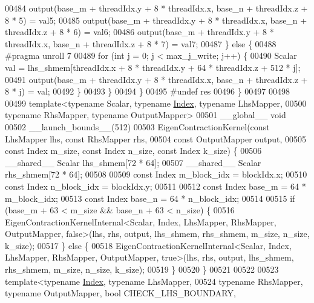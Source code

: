 \begin{DoxyCode}
00484       output(base\_m + threadIdx.y + 8 * threadIdx.x, base\_n + threadIdx.z + 8 * 5) = val5;
00485       output(base\_m + threadIdx.y + 8 * threadIdx.x, base\_n + threadIdx.z + 8 * 6) = val6;
00486       output(base\_m + threadIdx.y + 8 * threadIdx.x, base\_n + threadIdx.z + 8 * 7) = val7;
00487     \} \textcolor{keywordflow}{else} \{
00488 \textcolor{preprocessor}{#pragma unroll 7}
00489       \textcolor{keywordflow}{for} (\textcolor{keywordtype}{int} j = 0; j < max\_j\_write; j++) \{
00490         Scalar val = lhs\_shmem[threadIdx.x + 8 * threadIdx.y + 64 * threadIdx.z + 512 * j];
00491         output(base\_m + threadIdx.y + 8 * threadIdx.x, base\_n + threadIdx.z + 8 * j) = val;
00492       \}
00493     \}
00494   \}
00495 \textcolor{preprocessor}{#undef res}
00496 \}
00497 
00498 
00499 \textcolor{keyword}{template}<\textcolor{keyword}{typename} Scalar, \textcolor{keyword}{typename} \hyperlink{namespace_eigen_a62e77e0933482dafde8fe197d9a2cfde}{Index}, \textcolor{keyword}{typename} LhsMapper,
00500          \textcolor{keyword}{typename} RhsMapper, \textcolor{keyword}{typename} OutputMapper>
00501 \_\_global\_\_ \textcolor{keywordtype}{void}
00502 \_\_launch\_bounds\_\_(512)
00503 EigenContractionKernel(const LhsMapper lhs, const RhsMapper rhs,
00504                        const OutputMapper output,
00505                        const Index m\_size, const Index n\_size, const Index k\_size) \{
00506   \_\_shared\_\_ Scalar lhs\_shmem[72 * 64];
00507   \_\_shared\_\_ Scalar rhs\_shmem[72 * 64];
00508 
00509   \textcolor{keyword}{const} Index m\_block\_idx = blockIdx.x;
00510   \textcolor{keyword}{const} Index n\_block\_idx = blockIdx.y;
00511 
00512   \textcolor{keyword}{const} Index base\_m = 64 * m\_block\_idx;
00513   \textcolor{keyword}{const} Index base\_n = 64 * n\_block\_idx;
00514 
00515   \textcolor{keywordflow}{if} (base\_m + 63 < m\_size && base\_n + 63 < n\_size) \{
00516     EigenContractionKernelInternal<Scalar, Index, LhsMapper, RhsMapper, OutputMapper, false>(lhs, rhs, 
      output, lhs\_shmem, rhs\_shmem, m\_size, n\_size, k\_size);
00517   \} \textcolor{keywordflow}{else} \{
00518     EigenContractionKernelInternal<Scalar, Index, LhsMapper, RhsMapper, OutputMapper, true>(lhs, rhs, 
      output, lhs\_shmem, rhs\_shmem, m\_size, n\_size, k\_size);
00519   \}
00520 \}
00521 
00522 
00523 \textcolor{keyword}{template}<\textcolor{keyword}{typename} \hyperlink{namespace_eigen_a62e77e0933482dafde8fe197d9a2cfde}{Index}, \textcolor{keyword}{typename} LhsMapper,
00524          \textcolor{keyword}{typename} RhsMapper, \textcolor{keyword}{typename} OutputMapper, \textcolor{keywordtype}{bool} CHECK\_LHS\_BOUNDARY,

\end{DoxyCode}
